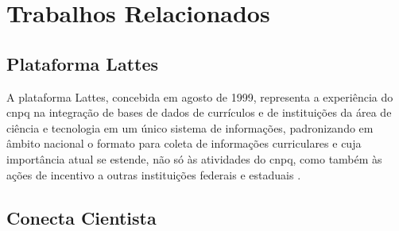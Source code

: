 \chapter{Trabalhos Relacionados}\label{cap:trabalhos:relacionados}

\section{Plataforma Lattes}\label{sec:lattes}

A plataforma Lattes, concebida em agosto de 1999, representa a experiência do \gls{cnpq} na integração de bases de dados de currículos e de instituições da área de ciência e tecnologia em um único sistema de informações, padronizando em âmbito nacional o formato para coleta de informações curriculares e cuja importância atual se estende, não só às atividades do \gls{cnpq}, como também às ações de incentivo a outras instituições federais e estaduais \cite{Lattes}.

\section{Conecta Cientista}\label{sec:conecta}

